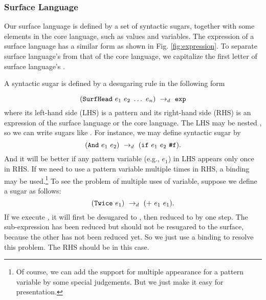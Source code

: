 
\subsubsection{Surface Language}
\label{mark:suflang}

Our surface language is defined by a set of syntactic sugars, together with some elements in the core language, such as values and variables. The expression of a surface language has a similar form as shown in Fig.  \ref{fig:expression}. To separate surface language's  from that of the core language, we capitalize the first letter of surface language's .

A syntactic sugar  is defined by a desugaring rule in the following form

\[
\drule{(\m{SurfHead}~e_1~e_2~\ldots~e_n)}{\m{exp}} %
\]
where its left-hand side (LHS) is a pattern and its right-hand side (RHS) is an expression of the surface language or the core language. The LHS may be nested , so we can write sugars like . For instance, we may define syntactic sugar  by
\[
(\mbox{\tt And}~e_1~e_2) ~\rightarrow_d~ (\mbox{\tt if}~e_1~e_2~\mbox{\tt \#f}).
\]
And it will be better if any pattern variable (e.g., $e_1$) in LHS appears only once in RHS.
If we need to use a pattern variable multiple times in RHS, a  binding may be used.\footnote{Of course, we can add the support for multiple appearance for a pattern variable by some special judgements. But we just make it easy for presentation.} To see the problem of multiple uses of variable, suppose we define a sugar as follows:
\[
(\mbox{\tt Twice}~e_1) ~\rightarrow_d~ (+~e_1~e_1).
\]
If we execute , it will first be desugared to , then reduced to  by one step. The sub-expression  has been reduced but should not be resugared to the surface, because the other  has not been reduced yet.
So we just use a  binding to resolve this problem. The RHS should be  in this case.


